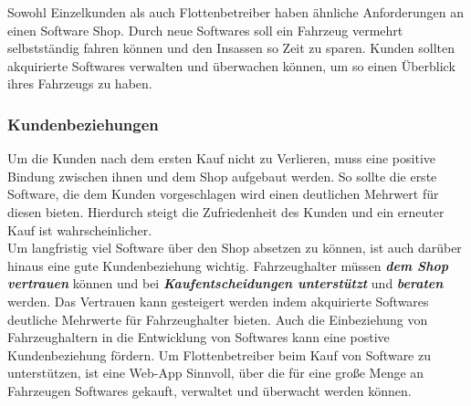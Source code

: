 %	
%	
%	

Sowohl Einzelkunden als auch Flottenbetreiber haben ähnliche Anforderungen an einen Software Shop. Durch neue Softwares soll ein Fahrzeug vermehrt selbstständig fahren können und den Insassen so Zeit zu sparen. Kunden sollten akquirierte Softwares verwalten und überwachen können, um so einen Überblick ihres Fahrzeugs zu haben.

\subsubsection{Kundenbeziehungen}
Um die Kunden nach dem ersten Kauf nicht zu Verlieren, muss eine positive Bindung zwischen ihnen und dem Shop aufgebaut werden. So sollte die erste Software, die dem Kunden vorgeschlagen wird einen deutlichen Mehrwert für diesen bieten. Hierdurch steigt die Zufriedenheit des Kunden und ein erneuter Kauf ist wahrscheinlicher.\\
Um langfristig viel Software über den Shop absetzen zu können, ist auch darüber hinaus eine gute Kundenbeziehung wichtig. Fahrzeughalter müssen \textit{\textbf{dem Shop vertrauen}} können und bei \textit{\textbf{Kaufentscheidungen unterstützt}} und \textbf{\textit{beraten}} werden. Das Vertrauen kann gesteigert werden indem akquirierte Softwares deutliche Mehrwerte für Fahrzeughalter bieten. Auch die Einbeziehung von Fahrzeughaltern in die Entwicklung von Softwares kann eine postive Kundenbeziehung fördern. Um Flottenbetreiber beim Kauf von Software zu unterstützen, ist eine Web-App Sinnvoll, über die für eine große Menge an Fahrzeugen Softwares gekauft, verwaltet und überwacht werden können.

